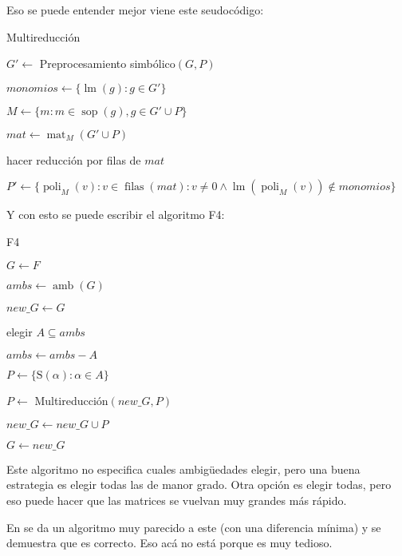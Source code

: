 \documentclass[12pt]{report}
\theoremstyle{customstyle}
\theoremstyle{factstyle}
\DeclareMathOperator{\sop}{sop}
\DeclareMathOperator{\lm}{lm}
\DeclareMathOperator{\amb}{amb}
\renewcommand{\S}{\text{S}}
\DeclareMathOperator{\mat}{mat}
\DeclareMathOperator{\poli}{poli}
\DeclareMathOperator{\filas}{filas}
\begin{document}
Eso se puede entender mejor viene este seudocódigo:

\begin{algorithm}[H] %
  \caption{Multireducción}\label{alg:Multireducción}
  $G' ←$ Preprocesamiento simbólico$(G, P)$

  $monomios ← \{\lm(g) : g ∈ G'\}$

  $M ← \{m : m ∈ \sop(g), g ∈ G' ∪ P\}$

  $mat ← \mat_M(G' ∪ P)$

  hacer reducción por filas de $mat$

  $P' ← \{\poli_M(v) : v ∈ \filas(mat) : v ≠ 0 ∧ \lm(\poli_M(v)) ∉ monomios\}$

\end{algorithm}

Y con esto se puede escribir el algoritmo F4:

\begin{algorithm}[H] %
  \caption{F4}\label{alg:F4}
  $G ← F$

  \Loop{} {
    $ambs ← \amb(G)$

    $new\_G ← G$

     {
      elegir $Α ⊆ ambs$

      $ambs ← ambs - Α$

      $P ← \{\S(α) : α ∈ Α\}$

      $P ←$ Multireducción$(new\_G, P)$

      $new\_G ← new\_G ∪ P$
    }

     {
      \Break
    }

    $G ← new\_G$
  }

\end{algorithm}

Este algoritmo no especifica cuales ambigüedades elegir, pero una buena estrategia es elegir todas las de manor grado. Otra opción es elegir todas, pero eso puede hacer que las matrices se vuelvan muy grandes más rápido.

En \cite{thesis:Hof20} se da un algoritmo muy parecido a este (con una diferencia mínima) y se demuestra que es correcto. Eso acá no está porque es muy tedioso.
\end{document}
